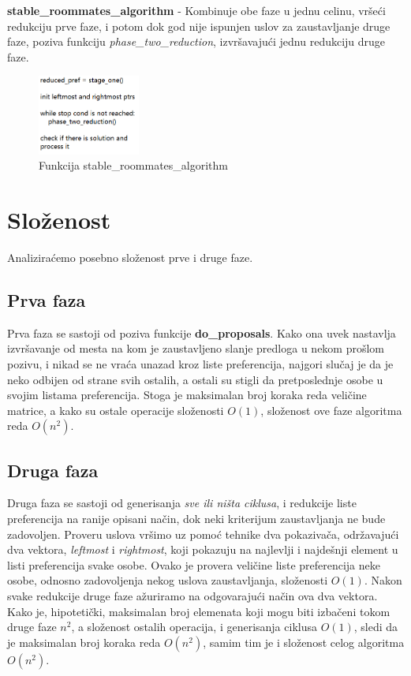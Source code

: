 \documentclass[a4paper]{article}
\begin{document}
\textbf{stable\_roommates\_algorithm} - Kombinuje obe faze u jednu celinu, vršeći redukciju prve faze, i potom dok god nije ispunjen uslov za zaustavljanje druge faze, poziva funkciju \textit{phase\_two\_reduction}, izvršavajući jednu redukciju druge faze.

\begin{figure}[H]
    \centering
    \includegraphics[width=0.3\textwidth]{stableroommates.png}
    \caption{Funkcija stable\_roommates\_algorithm}
    \label{sra}
\end{figure}

\section{Složenost}
Analiziraćemo posebno složenost prve i druge faze.
\subsection{Prva faza}
Prva faza se sastoji od poziva funkcije \textbf{do\_proposals}. Kako ona uvek nastavlja izvršavanje od mesta na kom je zaustavljeno slanje predloga u nekom prošlom pozivu, i nikad se ne vraća unazad kroz liste preferencija, najgori slučaj je da je neko odbijen od strane svih ostalih, a ostali su stigli da pretposlednje osobe u svojim listama preferencija. Stoga je maksimalan broj koraka reda veličine matrice, a kako su ostale operacije složenosti $O(1)$, složenost ove faze algoritma reda $O(n^2)$.
\subsection{Druga faza}
Druga faza se sastoji od generisanja \textit{sve ili ništa ciklusa}, i redukcije liste preferencija na ranije opisani način, dok neki kriterijum zaustavljanja ne bude zadovoljen. Proveru uslova vršimo uz pomoć tehnike dva pokazivača, održavajući dva vektora, \textit{leftmost} i \textit{rightmost}, koji pokazuju na najlevlji i najdešnji element u listi preferencija svake osobe. Ovako je provera veličine liste preferencija neke osobe, odnosno zadovoljenja nekog uslova zaustavljanja, složenosti $O(1)$. Nakon svake redukcije druge faze ažuriramo na odgovarajući način ova dva vektora. Kako je, hipotetički, maksimalan broj elemenata koji mogu biti izbačeni tokom druge faze $n^2$, a složenost ostalih operacija, i generisanja ciklusa $O(1)$, sledi da je maksimalan broj koraka reda $O(n^2)$, samim tim je i složenost celog algoritma $O(n^2)$.
\end{document}
